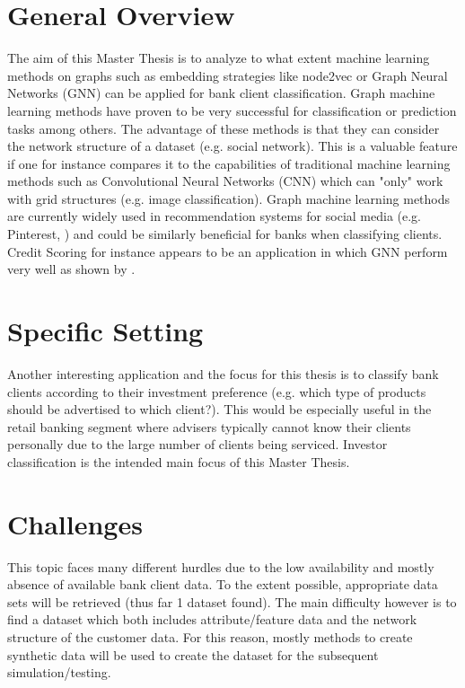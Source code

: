 	\section{General Overview}

	The aim of this Master Thesis is to analyze to what extent machine learning methods on graphs such as embedding strategies like node2vec 
	\citep{grover2016node2vec} or Graph Neural Networks (GNN) \citep{kipf2016semi,hamilton2017inductive,velivckovic2017graph,vaswani2017attention} 
	can be applied for bank client classification. Graph machine learning methods have proven to be very successful for classification or prediction 
	tasks among others. 
	The advantage of these methods is that they can consider the network structure of a dataset (e.g. social network). This is a valuable feature 
	if one for instance compares it to the capabilities of traditional machine learning methods such as Convolutional Neural Networks (CNN) which can 
	"only" work with grid structures (e.g. image classification). Graph machine learning methods are currently widely used in recommendation systems 
	for social media (e.g. Pinterest, \citet{ying2018graph}) and could be similarly beneficial for banks when classifying clients. Credit Scoring for 
	instance appears to be an application in which GNN perform very well as shown by \citet{sukharev2020ews}. \\

	\section{Specific Setting}

	\noindent Another interesting application and the focus for this thesis is to classify bank clients according to their investment preference 
	(e.g. which type of products should be advertised to which client?). This would be especially useful in the retail banking segment where advisers 
	typically cannot know their clients personally due to the large number of clients being serviced. Investor classification is the intended main focus
	of this Master Thesis. \\

	\section{Challenges}

	\noindent This topic faces many different hurdles due to the low availability and mostly absence of available bank client data. To the extent 
	possible, appropriate data sets will be retrieved (thus far 1 dataset found). The main difficulty however is to find a dataset which both includes 
	attribute/feature data and the network structure of the customer data. For this reason, mostly methods to create synthetic data will be used to 
	create the dataset for the subsequent simulation/testing.


